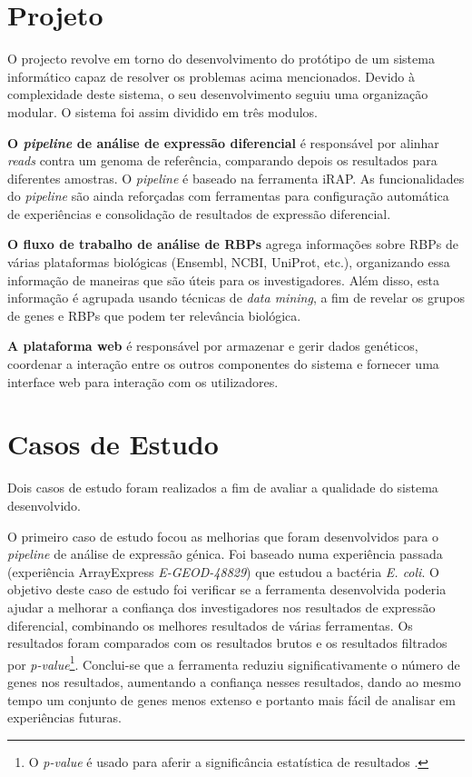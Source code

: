 \documentclass[9pt,a4paper]{extarticle}
\begin{document}
\begin{multicols}{2}
\section{Projeto} \label{sec:project}

O projecto revolve em torno do desenvolvimento do protótipo de um sistema
informático capaz de resolver os problemas acima mencionados. Devido à
complexidade deste sistema, o seu desenvolvimento seguiu uma organização
modular. O sistema foi assim dividido em três modulos.

  \textbf{O \emph{pipeline} de análise de expressão diferencial} é responsável
  por alinhar \emph{reads} contra um genoma de referência, comparando depois os
  resultados para diferentes amostras. O \emph{pipeline} é baseado na ferramenta
  iRAP. As funcionalidades do \emph{pipeline} são ainda reforçadas com
  ferramentas para configuração automática de experiências e consolidação de
  resultados de expressão diferencial.

  \textbf{O fluxo de trabalho de análise de RBPs} agrega informações sobre RBPs
  de várias plataformas biológicas (Ensembl, NCBI, UniProt, etc.), organizando
  essa informação de maneiras que são úteis para os investigadores. Além disso,
  esta informação é agrupada usando técnicas de \emph{data mining}, a fim de
  revelar os grupos de genes e RBPs que podem ter relevância biológica.

  \textbf{A plataforma web} é responsável por armazenar e gerir dados genéticos,
  coordenar a interação entre os outros componentes do sistema e fornecer uma
  interface web para interação com os utilizadores.

\section{Casos de Estudo}

Dois casos de estudo foram realizados a fim de avaliar a qualidade do sistema
desenvolvido.

O primeiro caso de estudo focou as melhorias que foram desenvolvidos para o
\emph{pipeline} de análise de expressão génica. Foi baseado numa experiência
passada (experiência ArrayExpress \emph{E-GEOD-48829}) que estudou a bactéria
\emph{E. coli}. O objetivo deste caso de estudo foi verificar se a ferramenta
desenvolvida poderia ajudar a melhorar a confiança dos investigadores nos
resultados de expressão diferencial, combinando os melhores resultados de várias
ferramentas. Os resultados foram comparados com os resultados brutos e os
resultados filtrados por \emph{p-value}\footnote{O \emph{p-value} é usado para
aferir a significância estatística de resultados \cite{goodman45dirty}.}.
Conclui-se que a ferramenta reduziu significativamente o número de genes nos
resultados, aumentando a confiança nesses resultados, dando ao mesmo tempo um
conjunto de genes menos extenso e portanto mais fácil de analisar em
experiências futuras.


\end{multicols}
\end{document}
